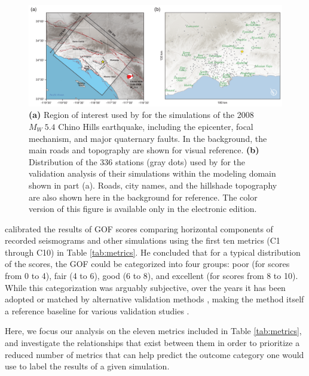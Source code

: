 \begin{figure}
    \centering
    \includegraphics[width=\textwidth]{figures/pdf/figure-01}
    \caption{\textbf{(a)} Region of interest used by \citet{Taborda_2014_BSSA} for the simulations of the 2008 $M_W ~ 5.4$ Chino Hills earthquake, including the epicenter, focal mechanism, and major quaternary faults. In the background, the main roads and topography are shown for visual reference. \textbf{(b)} Distribution of the 336 stations (gray dots) used by \citet{Taborda_2014_BSSA} for the validation analysis of their simulations within the modeling domain shown in part (a). Roads, city names, and the hillshade topography are also shown here in the background for reference. The color version of this figure is available only in the electronic edition.}
    \label{fig:chino-hills}
\end{figure}

\citet{Anderson_2004_Proc} calibrated the results of GOF scores comparing horizontal components of recorded seismograms and other simulations using the first ten metrics (C1 through C10) in Table \ref{tab:metrics}. He concluded that for a typical distribution of the scores, the GOF could be categorized into four groups: poor (for scores from 0 to 4), fair (4 to 6), good (6 to 8), and excellent (for scores from 8 to 10). While this categorization was arguably subjective, over the years it has    been adopted or matched by alternative validation methods \citep[e.g.,][]{Kristekova_2009_GJI, Olsen_2010_SRL}, making the method itself a reference baseline for various validation studies \citep[e.g.,][]{Chaljub_2010_BSSA, Bielak_2010_GJI, Guidotti_2011_SRL, Maufroy_2015_BSSA}.

Here, we focus our analysis on the eleven metrics included in Table \ref{tab:metrics}, and investigate the relationships that exist between them in order to prioritize a reduced number of metrics that can help predict the outcome category one would use to label the results of a given simulation.
